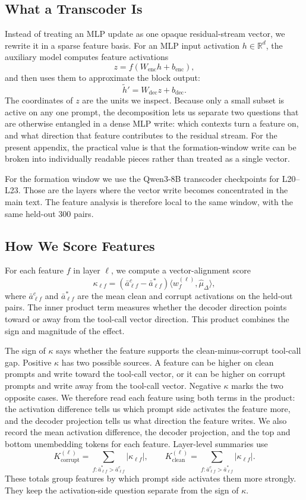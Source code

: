 \subsection{What a Transcoder Is}
Instead of treating an MLP update as one opaque residual-stream vector, we
rewrite it in a sparse feature basis. For an MLP input activation
$h \in \mathbb{R}^d$, the auxiliary model computes feature activations
\[
  z = f(W_{\mathrm{enc}} h + b_{\mathrm{enc}}),
\]
and then uses them to approximate the block output:
\[
  \tilde{h}' = W_{\mathrm{dec}} z + b_{\mathrm{dec}}.
\]
The coordinates of $z$ are the units we inspect. Because only a small subset is
active on any one prompt, the decomposition lets us separate two questions that
are otherwise entangled in a dense MLP write: which contexts turn a feature on,
and what direction that feature contributes to the residual stream. For the
present appendix, the practical value is that the formation-window write can be
broken into individually readable pieces rather than treated as a single vector.

For the formation window we use the Qwen3-8B transcoder checkpoints for
L20--L23. Those are the layers where the vector write becomes concentrated in
the main text. The feature analysis is therefore local to the same window,
with the same held-out 300 pairs.

\subsection{How We Score Features}
For each feature $f$ in layer $\ell$, we compute a vector-alignment score
\[
  \kappa_{\ell f}
  = (\bar{a}^c_{\ell f} - \bar{a}^*_{\ell f})
    \langle w_f^{(\ell)}, \hat{\mu}_\Delta \rangle,
\]
where $\bar{a}^c_{\ell f}$ and $\bar{a}^*_{\ell f}$ are the mean clean and
corrupt activations on the held-out pairs.
The inner product term measures whether the decoder direction points toward
or away from the tool-call vector direction. This product combines the sign
and magnitude of the effect.

The sign of $\kappa$ says whether the feature supports the clean-minus-corrupt
tool-call gap. Positive $\kappa$ has two possible sources. A feature can be
higher on clean prompts and write toward the tool-call vector, or it can be
higher on corrupt prompts and write away from the tool-call vector. Negative
$\kappa$ marks the two opposite cases. We therefore read each feature using
both terms in the product: the activation difference tells us which prompt side
activates the feature more, and the decoder projection tells us what direction
the feature writes.
We also record the mean activation difference, the decoder projection, and
the top and bottom unembedding tokens for each feature.
Layer-level summaries use
\[
K_{\mathrm{corrupt}}^{(\ell)}
= \sum_{f:\bar{a}^*_{\ell f}>\bar{a}^c_{\ell f}} |\kappa_{\ell f}|,
\qquad
K_{\mathrm{clean}}^{(\ell)}
= \sum_{f:\bar{a}^c_{\ell f}>\bar{a}^*_{\ell f}} |\kappa_{\ell f}|.
\]
These totals group features by which prompt side activates them more strongly.
They keep the activation-side question separate from the sign of $\kappa$.

